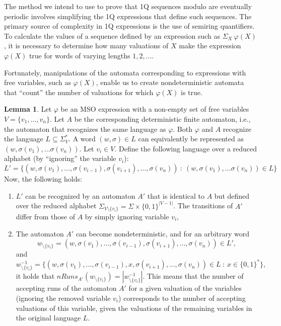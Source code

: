 \documentclass[12pt]{article}
\theoremstyle{definition}
\newtheorem{lemma}[theorem]{Lemma}
\begin{document}
The method we intend to use to prove that 1Q sequences modulo are eventually periodic involves simplifying the 1Q expressions that define such sequences. The primary source of complexity in 1Q expressions is the use of semiring quantifiers. To calculate the values of a sequence defined by an expression such as $\Sigma_X \ \varphi(X)$, it is necessary to determine how many valuations of $X$ make the expression $\varphi(X)$ true for words of varying lengths $1,2,\ldots$.

Fortunately, manipulations of the automata corresponding to expressions with free variables, such as $\varphi(X)$, enable us to create nondeterministic automata that ``count'' the number of valuations for which $\varphi(X)$ is true.

\begin{lemma}
\label{LemElimVar}
    Let $\varphi$ be an MSO expression with a non-empty set of free variables $V = \{v_1, \ldots, v_n\}$. Let $A$ be the corresponding deterministic finite automaton, i.e., the automaton that recognizes the same language as $\varphi$. Both $\varphi$ and $A$ recognize the language $L \subseteq \Sigma_V^*$. A word $(w, \sigma) \in L$ can equivalently be represented as $(w, \sigma(v_1), \ldots \sigma(v_n))$. Let $v_i \in V$. Define the following language over a reduced alphabet (by ``ignoring'' the variable $v_i$): 
    $$L' = \{(w, \sigma(v_1), \ldots, \sigma(v_{i-1}), \sigma(v_{i+1}), \ldots, \sigma(v_n)) \ : \ (w, \sigma(v_1), \ldots \sigma(v_n)) \in L\}$$
    Now, the following holds:
    \begin{enumerate}
        \item $L'$ can be recognized by an automaton $A'$ that is identical to $A$ but defined over the reduced alphabet $\Sigma_{V \setminus \{v_i\}} = \Sigma \times \{0, 1\}^{|V-1|}$. The transitions of $A'$ differ from those of $A$ by simply ignoring variable $v_i$,
        \item The automaton $A'$ can become nondeterministic, and for an arbitrary word
        $$w_{\setminus\{v_i\}} = (w, \sigma(v_1), \ldots, \sigma(v_{i-1}), \sigma(v_{i+1}), \ldots, \sigma(v_n)) \in L',$$ and 
        $$w^{-1}_{\setminus\{v_i\}} = \{(w, \sigma(v_1), \ldots, \sigma(v_{i-1}), x, \sigma(v_{i+1}), \ldots, \sigma(v_n)) \in L \ : \ x \in \{0, 1\}^* \},$$
        it holds that $nRuns_{A'}(w_{\setminus\{v_i\}}) = |w^{-1}_{\setminus\{v_i\}}|$. This means that the number of accepting runs of the automaton $A'$ for a given valuation of the variables (ignoring the removed variable $v_i$) corresponds to the number of accepting valuations of this variable, given the valuations of the remaining variables in the original language $L$.
    \end{enumerate}
\end{lemma}
\end{document}
